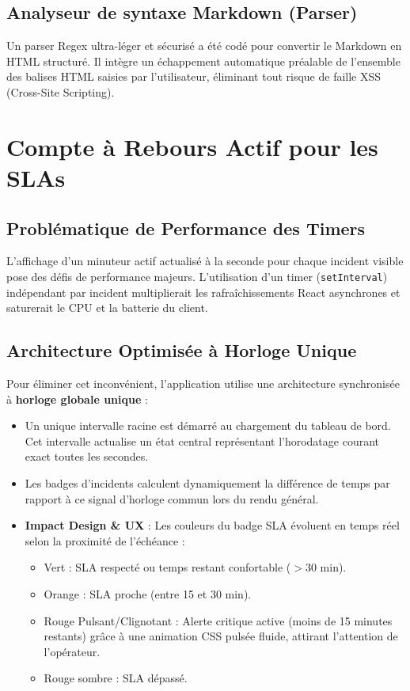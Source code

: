 \documentclass[12pt,a4paper]{article}
\begin{document}
\subsection{Analyseur de syntaxe Markdown (Parser)}
Un parser Regex ultra-léger et sécurisé a été codé pour convertir le Markdown en HTML structuré. Il intègre un échappement automatique préalable de l'ensemble des balises HTML saisies par l'utilisateur, éliminant tout risque de faille XSS (Cross-Site Scripting).

\section{Compte à Rebours Actif pour les SLAs}
\subsection{Problématique de Performance des Timers}
L'affichage d'un minuteur actif actualisé à la seconde pour chaque incident visible pose des défis de performance majeurs. L'utilisation d'un timer (\texttt{setInterval}) indépendant par incident multiplierait les rafraîchissements React asynchrones et saturerait le CPU et la batterie du client.

\subsection{Architecture Optimisée à Horloge Unique}
Pour éliminer cet inconvénient, l'application utilise une architecture synchronisée à \textbf{horloge globale unique} :
\begin{itemize}
    \item Un unique intervalle racine est démarré au chargement du tableau de bord. Cet intervalle actualise un état central représentant l'horodatage courant exact toutes les secondes.
    \item Les badges d'incidents calculent dynamiquement la différence de temps par rapport à ce signal d'horloge commun lors du rendu général.
    \item \textbf{Impact Design \& UX} : Les couleurs du badge SLA évoluent en temps réel selon la proximité de l'échéance :
    \begin{itemize}
        \item Vert : SLA respecté ou temps restant confortable ($> 30$ min).
        \item Orange : SLA proche (entre 15 et 30 min).
        \item Rouge Pulsant/Clignotant : Alerte critique active (moins de 15 minutes restants) grâce à une animation CSS pulsée fluide, attirant l'attention de l'opérateur.
        \item Rouge sombre : SLA dépassé.
    \end{itemize}
\end{itemize}
\end{document}
